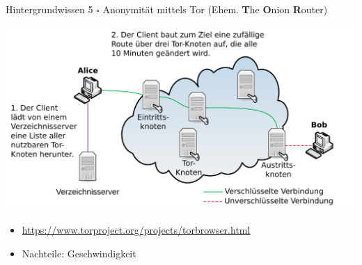 \documentclass{beamer}
\begin{document}
\begin{frame}[label=bg5]{Hintergrundwissen 5}
$\square$ Anonymität mittels Tor (Ehem. \textbf{T}he \textbf{O}nion \textbf{R}outer)

\begin{center}
\includegraphics[width=0.6\columnwidth]{img-src/TOR_Arbeitsweise}
\end{center}

\pause 
\begin{itemize}
\item {\small \url{https://www.torproject.org/projects/torbrowser.html}}
\item Nachteile: Geschwindigkeit
\end{itemize}
\end{frame}



\end{document}

